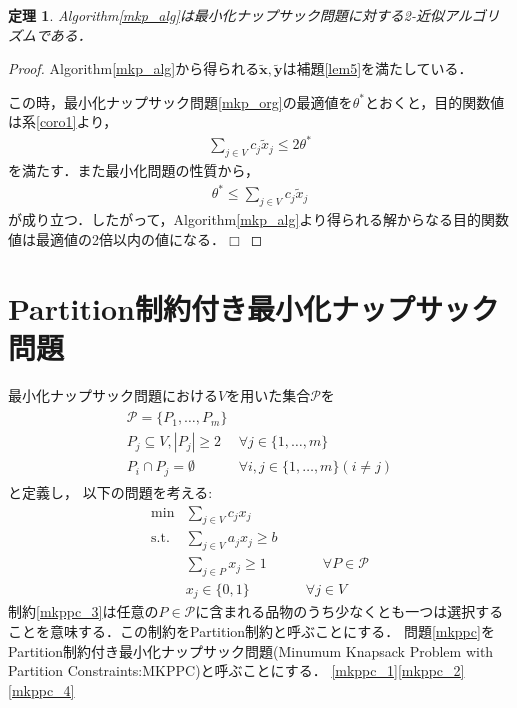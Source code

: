 \documentclass[11pt,dvipdfmx]{jarticle}
\def\qed{\hfill $\Box$}
\numberwithin{equation}{section}
\newtheorem{theorem}{定理}[section]
\newtheorem{proof}{証明}
\begin{document}
            \begin{theorem}
                \rm Algorithm\ref{mkp_alg}は最小化ナップサック問題に対する2-近似アルゴリズムである．
            \end{theorem}
            \begin{proof}
                \rm Algorithm\ref{mkp_alg}から得られる$\tilde{\bm{x}},\tilde{\bm{y}}$は補題\ref{lem5}を満たしている．\par
                この時，最小化ナップサック問題\eqref{mkp_org}の最適値を$\theta^*$とおくと，目的関数値は系\ref{coro1}より，
                \begin{align}
                    \sum_{j\in V}{c_j\tilde{x}_j}\le 2\theta^*
                \end{align}
                を満たす．また最小化問題の性質から，
                \begin{align}
                    \theta^*\le\sum_{j\in V}{c_j\tilde{x}_j}
                \end{align}
                が成り立つ．したがって，Algorithm\ref{mkp_alg}より得られる解からなる目的関数値は最適値の2倍以内の値になる．\qed
            \end{proof}
\section{Partition制約付き最小化ナップサック問題}
    最小化ナップサック問題における$V$を用いた集合$\mathcal{P}$を
    \begin{align}
        \begin{array}{ll}
            \mathcal{P} = \{P_1,\dotsc,P_m\} & \\ 
            P_j\subseteq V, |P_j|\ge 2 & \forall j\in\{1,\dotsc,m\}\\
            P_i\cap P_j = \emptyset & \forall i,j \in \{1,\dotsc,m\}(i\neq j)
        \end{array}
    \end{align}
    と定義し，
    以下の問題を考える:
    \begin{subequations}
        \begin{align}
                \mathrm{min } & \displaystyle\sum_{j\in V}{c_jx_j}\label{mkppc_1}\\
                \mathrm{s.t.} & \displaystyle\sum_{j\in V}{a_jx_j}\ge b\label{mkppc_2}\\
                            & \displaystyle\sum_{j\in P}{x_j}\ge 1 \qquad\qquad \forall P\in \mathcal{P}\label{mkppc_3}\\
                            & x_j \in \{0,1\} \qquad\qquad \forall j\in V\label{mkppc_4}
        \end{align}\label{mkppc}
    \end{subequations}
    制約\eqref{mkppc_3}は任意の$P\in\mathcal{P}$に含まれる品物のうち少なくとも一つは選択することを意味する．この制約をPartition制約と呼ぶことにする．
    問題\eqref{mkppc}をPartition制約付き最小化ナップサック問題(Minumum Knapsack Problem with Partition Constraints:MKPPC)と呼ぶことにする．
    \color{white} \eqref{mkppc_1}\eqref{mkppc_2}\eqref{mkppc_4}\color{black}
\end{document}
